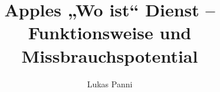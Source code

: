 \documentclass[runningheads]{llncs}
\begin{document}
\title{Apples „Wo ist“ Dienst – Funktionsweise und Missbrauchspotential}


\author{Lukas Panni}


\maketitle              %

\begin{abstract}
\end{abstract}




\newpage







\end{document}
